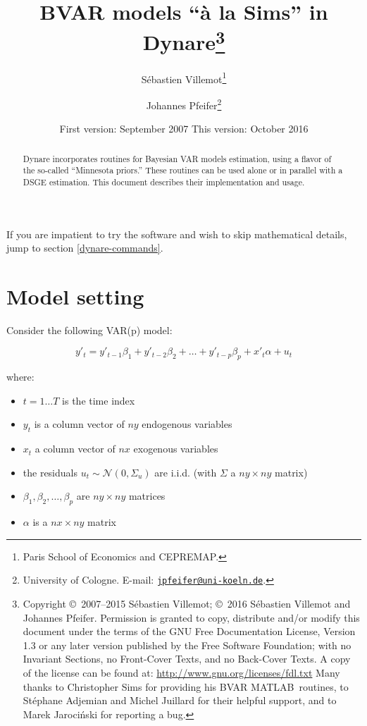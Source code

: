 \documentclass[11pt,a4paper]{article}
\begin{document}
\title{BVAR models ``\`a la Sims'' in Dynare\thanks{Copyright \copyright~2007--2015 S\'ebastien
    Villemot; \copyright~2016 S\'ebastien
    Villemot and Johannes Pfeifer. Permission is granted to copy, distribute and/or modify
    this document under the terms of the GNU Free Documentation
    License, Version 1.3 or any later version published by the Free
    Software Foundation; with no Invariant Sections, no Front-Cover
    Texts, and no Back-Cover Texts. A copy of the license can be found
    at: \url{http://www.gnu.org/licenses/fdl.txt}
    \newline
    \indent Many thanks to Christopher Sims for providing his BVAR
    MATLAB\textregistered~routines, to St\'ephane Adjemian and Michel Juillard
    for their helpful support, and to Marek Jaroci\'nski for reporting a bug.
  }}

\author{S\'ebastien Villemot\thanks{Paris School of Economics and
    CEPREMAP.} \and Johannes Pfeifer\thanks{University of Cologne. E-mail: \href{mailto:jpfeifer@uni-koeln.de}{\texttt{jpfeifer@uni-koeln.de}}.}}
\date{First version: September 2007 \hspace{1cm} This version: October 2016}

\maketitle

\begin{abstract}
  Dynare incorporates routines for Bayesian VAR models estimation, using a
  flavor of the so-called ``Minnesota priors.'' These routines can be used
  alone or in parallel with a DSGE estimation. This document describes their
  implementation and usage.
\end{abstract}

If you are impatient to try the software and wish to skip mathematical details, jump to section \ref{dynare-commands}.

\section{Model setting}

Consider the following VAR(p) model:

$$y'_t = y'_{t-1}\beta_1 + y'_{t-2}\beta_2 + \ldots + y'_{t-p}\beta_p + x'_t\alpha + u_t$$

where:
\begin{itemize}
\item $t = 1\ldots T$ is the time index
\item $y_t$ is a column vector of $ny$ endogenous variables
\item $x_t$ a column vector of $nx$ exogenous variables
\item the residuals $u_t \sim \mathcal{N}(0, \Sigma_u)$ are i.i.d. (with $\Sigma$ a $ny\times ny$ matrix)
\item $\beta_1,\beta_2,\ldots,\beta_p$ are $ny\times ny$ matrices
\item $\alpha$ is a $nx\times ny$ matrix
\end{itemize}
\end{document}
